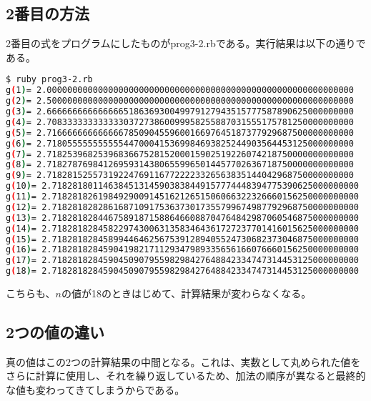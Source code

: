 \documentclass{jsarticle}
\begin{document}
\subsection{2番目の方法}

2番目の式をプログラムにしたものがprog3-2.rbである。実行結果は以下の通りである。

\begin{lstlisting}[language=sh]
$ ruby prog3-2.rb
g(1)= 2.000000000000000000000000000000000000000000000000000000000000
g(2)= 2.500000000000000000000000000000000000000000000000000000000000
g(3)= 2.666666666666666518636930049979127943515777587890625000000000
g(4)= 2.708333333333333037273860099958255887031555175781250000000000
g(5)= 2.716666666666666785090455960016697645187377929687500000000000
g(6)= 2.718055555555555447000415369984693825244903564453125000000000
g(7)= 2.718253968253968366752815200015902519226074218750000000000000
g(8)= 2.718278769841269593143806559965014457702636718750000000000000
g(9)= 2.718281525573192247691167722223326563835144042968750000000000
g(10)= 2.718281801146384513145903838449157774448394775390625000000000
g(11)= 2.718281826198492900914516212651506066322326660156250000000000
g(12)= 2.718281828286168710917536373017355799674987792968750000000000
g(13)= 2.718281828446758918715886466088704764842987060546875000000000
g(14)= 2.718281828458229743006313583464361727237701416015625000000000
g(15)= 2.718281828458994464625675391289405524730682373046875000000000
g(16)= 2.718281828459041982171129347989335656166076660156250000000000
g(17)= 2.718281828459045090795598298427648842334747314453125000000000
g(18)= 2.718281828459045090795598298427648842334747314453125000000000
\end{lstlisting}

こちらも、$n$の値が18のときはじめて、計算結果が変わらなくなる。

\subsection{2つの値の違い}

真の値はこの2つの計算結果の中間となる。これは、実数として丸められた値をさらに計算に使用し、それを繰り返しているため、加法の順序が異なると最終的な値も変わってきてしまうからである。
\end{document}

